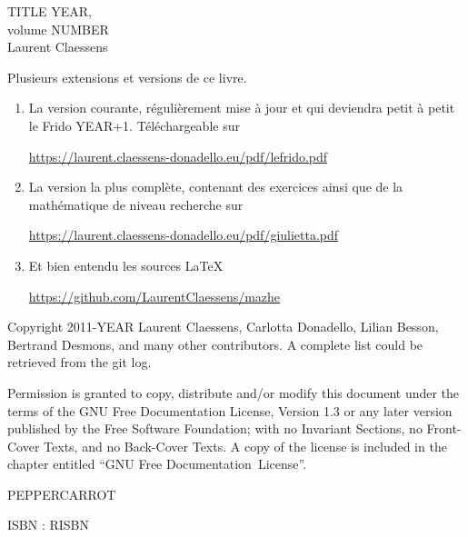 \documentclass[a4paper,twoside,11pt]{book}
\begin{document}
\pagestyle{empty}

\phantom{Foo}
\newpage

\phantom{Foo}
\newpage

\begin{center}
    TITLE YEAR, \\
    volume NUMBER \\
    Laurent Claessens
\end{center}

\newpage

Plusieurs extensions et versions de ce livre.
\begin{enumerate}
    \item
        La version courante, régulièrement mise à jour et qui deviendra petit à petit le Frido YEAR+1. Téléchargeable sur
        \begin{center}
            \url{https://laurent.claessens-donadello.eu/pdf/lefrido.pdf}
        \end{center}
    \item
        La version la plus complète, contenant des exercices ainsi que de la mathématique de niveau recherche sur
        \begin{center}
            \url{https://laurent.claessens-donadello.eu/pdf/giulietta.pdf}
        \end{center}
    \item
        Et bien entendu les sources \LaTeX\
        \begin{center}
            \url{https://github.com/LaurentClaessens/mazhe}
        \end{center}
\end{enumerate}

\newpage

\phantom{un foobar bleuté}

\vfill

\begin{center}
Copyright 2011-YEAR  Laurent Claessens, Carlotta Donadello, Lilian Besson, Bertrand Desmons, and many other contributors. A complete list could be retrieved from the git log.

Permission is granted to copy, distribute and/or modify this document under the terms of the GNU Free Documentation License, Version 1.3 or any later version published by the Free Software Foundation; with no Invariant Sections, no Front-Cover Texts, and no Back-Cover Texts. A copy of the license is included in the chapter entitled ``GNU Free Documentation~License''.
\end{center}

\begin{center}
    PEPPERCARROT
\end{center}

    \begin{center}
ISBN : RISBN
    \end{center}
\end{document}

